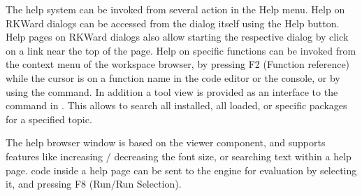 The help system can be invoked from several action in the
Help menu. Help on RKWard dialogs can be
accessed from the dialog itself using the
Help button. Help pages on RKWard dialogs
also allow starting the respective dialog by click on a link near the
top of the page. Help on  specific
 functions can be invoked from the context
menu of the workspace browser, by pressing F2 (Function
reference) while the cursor is on a function name in the
code editor or the  console, or by using
the  
command. In addition a tool view is provided as an interface to the
 command in
. This allows to search all installed, all
loaded, or specific  packages for a
specified topic.

The help browser window is based on the 
 viewer component, and supports
features like increasing / decreasing the font size, or searching text
within a help page.  code inside a help
page can be sent to the  engine for
evaluation by selecting it, and pressing F8 (Run/Run
Selection).

